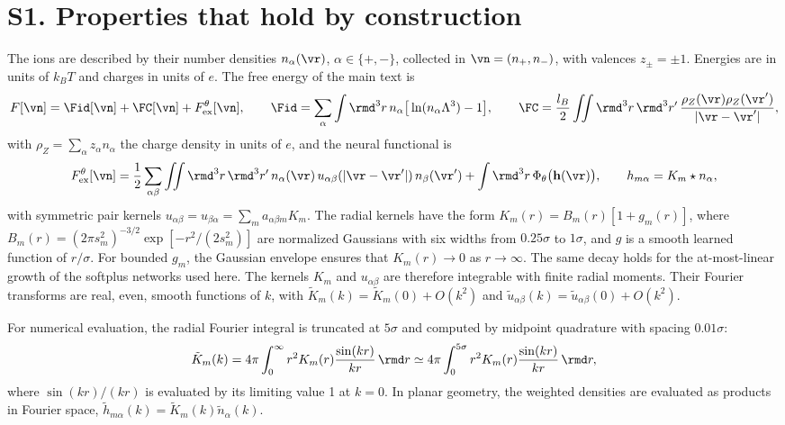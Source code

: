 \section*{S1. Properties that hold by construction}

The ions are described by their number densities $n_\alpha(\vr)$, $\alpha\in\{+,-\}$, collected in $\vn=(n_+,n_-)$, with valences $z_\pm=\pm1$. Energies are in units of $k_BT$ and charges in units of $e$. The free energy of the main text is
\begin{equation}
F[\vn]=\Fid[\vn]+\FC[\vn]+F^\theta_{\rm ex}[\vn],\qquad \Fid=\sum_\alpha\int \rmd^3r\,n_\alpha\big[\ln(n_\alpha\Lambda^3)-1\big],\qquad \FC=\frac{l_B}{2}\iint \rmd^3r\,\rmd^3r'\,\frac{\rho_Z(\vr)\rho_Z(\vr')}{|\vr-\vr'|},
\end{equation}
with $\rho_Z=\sum_\alpha z_\alpha n_\alpha$ the charge density in units of $e$, and the neural functional is
\begin{equation}
F^\theta_{\rm ex}[\vn]=\frac12\sum_{\alpha\beta}\iint \rmd^3r\,\rmd^3r'\,n_\alpha(\vr)\,u_{\alpha\beta}(|\vr-\vr'|)\,n_\beta(\vr')+\int \rmd^3r\,\Phi_\theta\big(\mathbf h(\vr)\big),\qquad h_{m\alpha}=K_m\star n_\alpha,
\end{equation}
with symmetric pair kernels $u_{\alpha\beta}=u_{\beta\alpha}=\sum_m a_{\alpha\beta m}K_m$. The radial kernels have the form $K_m(r)=B_m(r)[1+g_m(r)]$, where $B_m(r)=(2\pi s_m^2)^{-3/2}\exp[-r^2/(2s_m^2)]$ are normalized Gaussians with six widths from $0.25\sigma$ to $1\sigma$, and $g$ is a smooth learned function of $r/\sigma$. For bounded $g_m$, the Gaussian envelope ensures that $K_m(r)\to0$ as $r\to\infty$. The same decay holds for the at-most-linear growth of the softplus networks used here. The kernels $K_m$ and $u_{\alpha\beta}$ are therefore integrable with finite radial moments. Their Fourier transforms are real, even, smooth functions of $k$, with $\tilde K_m(k)=\tilde K_m(0)+O(k^2)$ and $\tilde u_{\alpha\beta}(k)=\tilde u_{\alpha\beta}(0)+O(k^2)$.

For numerical evaluation, the radial Fourier integral is truncated at $5\sigma$ and computed by midpoint quadrature with spacing $0.01\sigma$:
\[
\tilde K_m(k)=4\pi\int_0^\infty r^2K_m(r)\frac{\sin(kr)}{kr}\,\rmd r
\simeq4\pi\int_0^{5\sigma}r^2K_m(r)\frac{\sin(kr)}{kr}\,\rmd r,
\]
where $\sin(kr)/(kr)$ is evaluated by its limiting value 1 at $k=0$. In planar geometry, the weighted densities are evaluated as products in Fourier space, $\tilde h_{m\alpha}(k)=\tilde K_m(k)\tilde n_\alpha(k)$.

